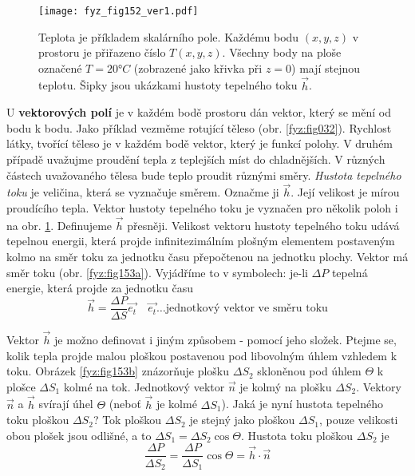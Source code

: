       \begin{figure}[ht!]
       \centering
       \texttt{[image: fyz\_fig152\_ver1.pdf]}
       \caption{Teplota je příkladem skalárního pole. Každému bodu $(x,y,z)$ v prostoru je 
                přiřazeno číslo $T(x,y,z)$. Všechny body na ploše označené $T = 20°C$ (zobrazené 
                jako křivka při $z=0$) mají stejnou teplotu. Šipky jsou ukázkami hustoty tepelného 
                toku $\vec{h}$.
                \cite[s.~29]{Feynman02}}
       \label{fyz:fig152} 
      \end{figure}
            
      U \textbf{vektorových polí} je v každém bodě prostoru dán vektor, který se mění od bodu k
      bodu. Jako příklad vezměme rotující těleso (obr. \ref{fyz:fig032}). Rychlost látky, tvořící
      těleso je v každém bodě vektor, který je funkcí polohy. V druhém případě uvažujme proudění
      tepla z teplejších míst do chladnějších. V různých částech uvažovaného tělesa bude teplo
      proudit různými směry. \emph{Hustota tepelného toku} je veličina, která se vyznačuje směrem.
      Označme ji $\vec{h}$. Její velikost je mírou proudícího tepla. Vektor hustoty tepelného toku
      je vyznačen pro několik poloh i na obr. \ref{fyz:fig152}. Definujeme $\vec{h}$ přesněji.
      Velikost vektoru hustoty tepelného toku udává tepelnou energii, která projde infinitezimálním
      plošným elementem postaveným kolmo na směr toku za jednotku času přepočtenou na  jednotku
      plochy. Vektor má směr toku (obr. \ref{fyz:fig153a}). Vyjádříme to v symbolech: je-li $\Delta
      P$ tepelná energie, která projde za jednotku času
      \begin{equation*}     %
       \vec{h}=\frac{\Delta P}{\Delta S}\vec{e_t}
               \quad \vec{e_t}\ldots\text{jednotkový vektor ve směru toku}
      \end{equation*}   

           
      Vektor $\vec{h}$ je možno definovat i jiným způsobem - pomocí jeho složek. Ptejme se, kolik 
      tepla projde malou ploškou postavenou pod libovolným úhlem vzhledem k toku. Obrázek 
      \ref{fyz:fig153b} znázorňuje plošku $\Delta S_2$ skloněnou pod úhlem $\Theta$ k plošce 
      $\Delta S_1$ kolmé na tok. Jednotkový vektor $\vec{n}$ je kolmý na plošku $\Delta S_2$. 
      Vektory $\vec{n}$ a $\vec{h}$ svírají úhel $\Theta$ (neboť $\vec{h}$ je kolmé $\Delta 
      S_1$). Jaká je nyní hustota tepelného toku ploškou $\Delta S_2$? Tok ploškou $\Delta S_2$ je 
      stejný jako ploškou $\Delta S_1$, pouze velikosti obou plošek jsou odlišné, a to $\Delta 
      S_1=\Delta S_2\cos\Theta$. Hustota toku ploškou $\Delta S_2$ je 
      \begin{equation}\label{fyz:eq248}
       \frac{\Delta P}{\Delta S_2}=\frac{\Delta P}{\Delta S_1}\cos{\Theta}=\vec{h}\cdot\vec{n}
      \end{equation}


